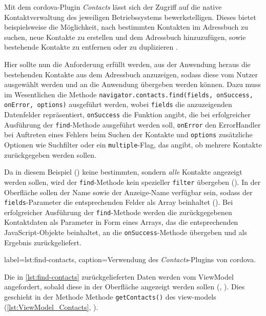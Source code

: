 Mit dem \gls{cordova}-Plugin \emph{Contacts} lässt sich der Zugriff auf die native Kontaktverwaltung des jeweiligen Betriebssystems bewerkstelligen.
Dieses bietet beispielsweise die Möglichkeit, nach bestimmten Kontakten im Adressbuch zu suchen, neue Kontakte zu erstellen und dem Adressbuch hinzuzufügen, sowie bestehende Kontakte zu entfernen oder zu duplizieren \cite{Cordova_Plugin_Registry_Contacts}.

Hier sollte nun die Anforderung erfüllt werden, aus der Anwendung heraus die bestehenden Kontakte aus dem Adressbuch anzuzeigen, sodass diese vom Nutzer ausgewählt werden und an die Anwendung übergeben werden können.
Dazu muss im Wesentlichen die Methode \lstinline|navigator.contacts.find(fields, onSuccess, onError, options)| ausgeführt werden, wobei \lstinline|fields| die anzuzeigenden Datenfelder repräsentiert, \lstinline|onSuccess| die Funktion angibt, die bei erfolgreicher Ausführung der \lstinline|find|-Methode ausgeführt werden soll, \lstinline|onError| den ErrorHandler bei Auftreten eines Fehlers beim Suchen der Kontakte und \lstinline|options| zusätzliche Optionen wie Suchfilter oder ein \lstinline|multiple|-Flag, das angibt, ob mehrere Kontakte zurückgegeben werden sollen.

Da in diesem Beispiel () keine bestimmten, sondern \emph{alle} Kontakte angezeigt werden sollen, wird der \lstinline|find|-Methode kein spezieller \lstinline|filter| übergeben (). In der Oberfläche sollen der Name sowie der Anzeige-Name verfügbar sein, sodass der \lstinline|fields|-Parameter die entsprechenden Felder als Array beinhaltet (). Bei erfolgreicher Ausführung der \lstinline|find|-Methode werden die zurückgegebenen Kontaktdaten als Parameter in Form eines Arrays, das die entsprechenden JavaScript-Objekte beinhaltet, an die \lstinline|onSuccess|-Methode übergeben und als Ergebnis zurückgeliefert.

	 { label=lst:find-contacts, caption={Verwendung des \emph{Contacts}-Plugins von \gls{cordova}.}}

Die in \autoref{lst:find-contacts} zurückgelieferten Daten werden vom ViewModel angefordert, sobald diese in der Oberfläche angezeigt werden sollen (, ).
Dies geschieht in der Methode Methode \lstinline|getContacts()| des \glspl{view-model} (\autoref{lst:ViewModel_Contacts}, ).

